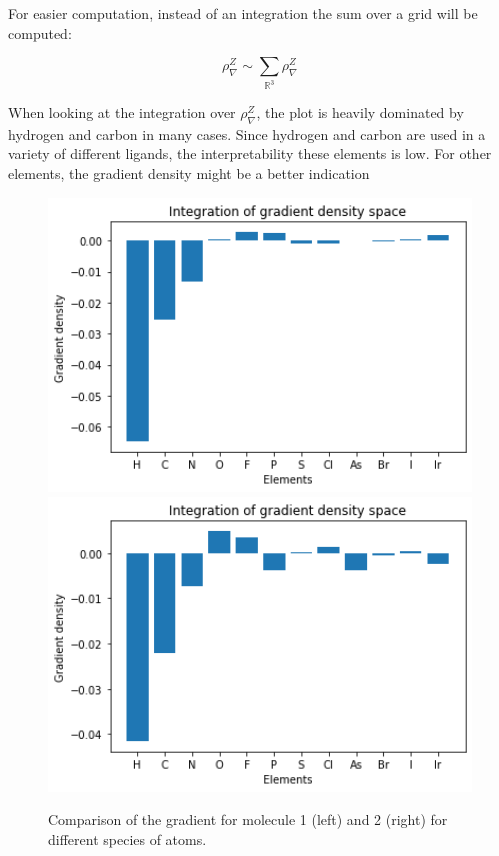 For easier computation, instead of an integration the sum over a grid will be computed: 

$$ \rho_\nabla^Z \sim \sum_{\mathbb{R}^3} \rho_\nabla^Z $$

When looking at the integration over $\rho^Z_\nabla$, the plot is heavily dominated by hydrogen and carbon
in many cases.
Since hydrogen and carbon are used in a variety of different ligands, the interpretability
these elements is low.
For other elements, the gradient density might be a better indication 


\begin{figure}[!htb]
    \includegraphics[width=1.0\textwidth]{figures/evaluation/elem2-GRAD.png}
  \endminipage\hfill
    \includegraphics[width=1.0\textwidth]{figures/evaluation/elem1-GRAD.png}
  \endminipage\hfill
  \caption[Comparison of summed gradients]{
    Comparison of the gradient for molecule 1 (left) and 2 (right) for different species of atoms.
  }
  \label{fig:snap_global_gradient}

\end{figure}


